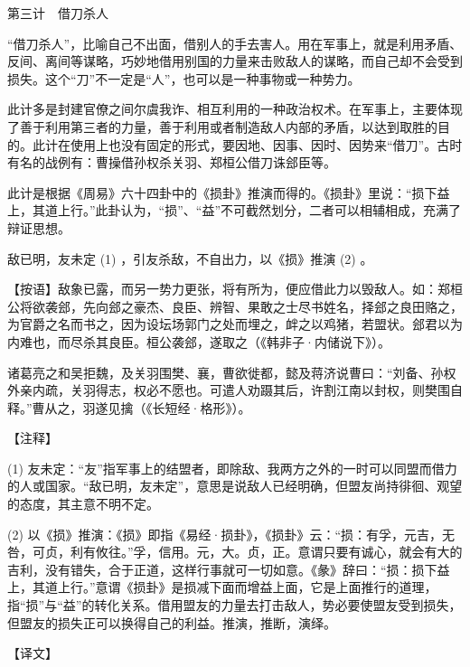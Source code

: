 \documentclass[12pt,UTF8]{ctexbook}
\begin{document}
第三计　借刀杀人


“借刀杀人”，比喻自己不出面，借别人的手去害人。用在军事上，就是利用矛盾、反间、离间等谋略，巧妙地借用别国的力量来击败敌人的谋略，而自己却不会受到损失。这个“刀”不一定是“人”，也可以是一种事物或一种势力。

此计多是封建官僚之间尔虞我诈、相互利用的一种政治权术。在军事上，主要体现了善于利用第三者的力量，善于利用或者制造敌人内部的矛盾，以达到取胜的目的。此计在使用上也没有固定的形式，要因地、因事、因时、因势来“借刀”。古时有名的战例有：曹操借孙权杀关羽、郑桓公借刀诛郐臣等。

此计是根据《周易》六十四卦中的《损卦》推演而得的。《损卦》里说：“损下益上，其道上行。”此卦认为，“损”、“益”不可截然划分，二者可以相辅相成，充满了辩证思想。





敌已明，友未定 (1) ，引友杀敌，不自出力，以《损》推演 (2) 。

【按语】敌象已露，而另一势力更张，将有所为，便应借此力以毁敌人。如：郑桓公将欲袭郐，先向郐之豪杰、良臣、辨智、果敢之士尽书姓名，择郐之良田赂之，为官爵之名而书之，因为设坛场郭门之处而埋之，衅之以鸡猪，若盟状。郐君以为内难也，而尽杀其良臣。桓公袭郐，遂取之（《韩非子·内储说下》）。

诸葛亮之和吴拒魏，及关羽围樊、襄，曹欲徙都，懿及蒋济说曹曰：“刘备、孙权外亲内疏，关羽得志，权必不愿也。可遣人劝蹑其后，许割江南以封权，则樊围自释。”曹从之，羽遂见擒（《长短经·格形》）。





【注释】


(1) 友未定：“友”指军事上的结盟者，即除敌、我两方之外的一时可以同盟而借力的人或国家。“敌已明，友未定”，意思是说敌人已经明确，但盟友尚持徘徊、观望的态度，其主意不明不定。

(2) 以《损》推演：《损》即指《易经·损卦》，《损卦》云：“损：有孚，元吉，无咎，可贞，利有攸往。”孚，信用。元，大。贞，正。意谓只要有诚心，就会有大的吉利，没有错失，合于正道，这样行事就可一切如意。《彖》辞曰：“损：损下益上，其道上行。”意谓《损卦》是损减下面而增益上面，它是上面推行的道理，指“损”与“益”的转化关系。借用盟友的力量去打击敌人，势必要使盟友受到损失，但盟友的损失正可以换得自己的利益。推演，推断，演绎。





【译文】
\end{document}
